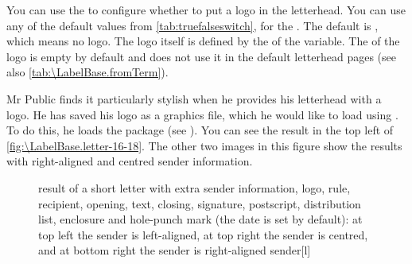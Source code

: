 \begin{Declaration}
\end{Declaration}
%
%
You can use the  to configure whether to put a
logo in the letterhead. You can use any of the default values from
\autoref{tab:truefalseswitch},  for the
. The default is , which means no logo. The
logo itself is defined by the  of the 
variable. The  of the logo is empty by default and
\KOMAScript{} does not use it in the default letterhead pages (see also
\autoref{tab:\LabelBase.fromTerm}).%
\begin{Example}
  Mr Public finds it particularly stylish when he provides his letterhead with
  a logo. He has saved his logo as a graphics file, which he would like to
  load using . To do this, he loads the
   package (see
  \cite{package:graphics}).%
  You can see the result in the top left of
  \autoref{fig:\LabelBase.letter-16-18}. The other two images in this figure
  show the results with right-aligned and centred sender information.
  \begin{figure}
    \setcapindent{0pt}%
    {\hfill
      \quad
      \par\bigskip}
    \begin{captionbeside}
      {result of a short letter with extra sender information, logo, rule,
        recipient, opening, text, closing, signature, postscript, distribution
        list, enclosure and hole-punch mark (the date is set by default):
        at top left the sender is left-aligned, at top right the sender is
        centred, and at bottom right the sender is right-aligned
        sender}[l]
      \quad
    \end{captionbeside}
  \label{fig:\LabelBase.letter-16-18}
  \end{figure}
\end{Example}%
%
\EndIndexGroup


